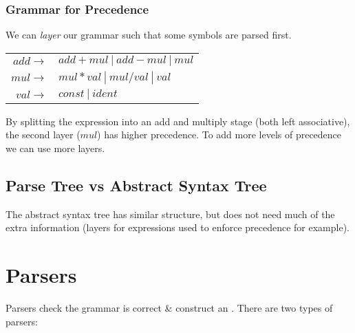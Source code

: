 \documentclass{report}
\begin{document}
            \subsubsection*{Grammar for Precedence}
                We can \textit{layer} our grammar such that some symbols are parsed first.
                \begin{center}
                    \begin{tabular}{r l }
                        $add \to$ & $ add + mul \ | \ add - mul \ | \ mul$ \\
                        $mul \to$ & $mul * val \ | \ mul / val \ | \ val$ \\
                        $val \to$ & $const \ | \ ident$ \\
                    \end{tabular}
                \end{center}
                By splitting the expression into an add and multiply stage (both left associative), the second layer ($mul$) has higher precedence. To add more levels of precedence we can use more layers.
        \pagebreak
        \subsection*{Parse Tree vs Abstract Syntax Tree}
            The abstract syntax tree has similar structure, but does not need much of the extra information (layers for expressions used to enforce precedence for example).
    
    \section*{Parsers}
        Parsers check the grammar is correct \& construct an . There are two types of parsers:
\end{document}
